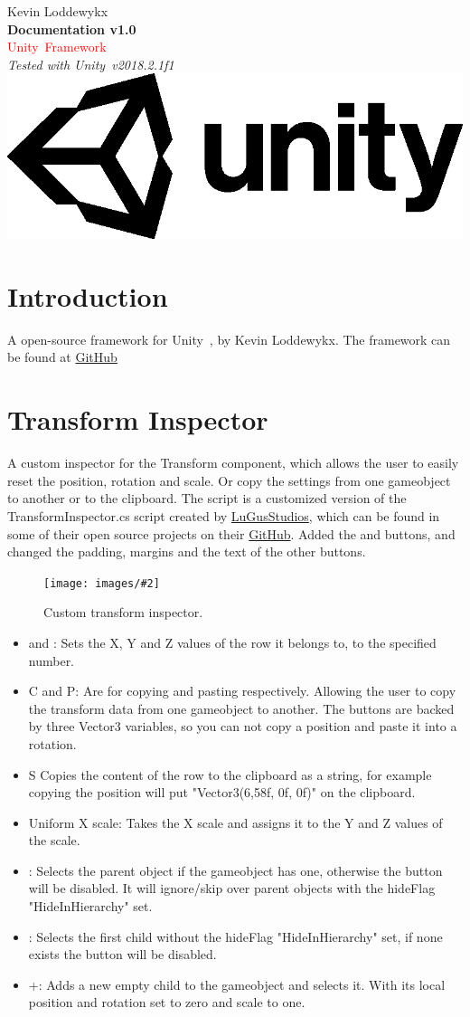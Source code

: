\documentclass{paper}
\newcommand{\frontpage}
{
	\begin{titlepage}
	
	\raggedleft
	\changebar
	\vspace{\baselineskip}

	{\small Kevin Loddewykx}\\[0.167\textheight]
	{\large \bfseries Documentation v1.0}\\[\baselineskip]
	{\textcolor{Red}{\huge Unity\textregistered\ Framework}}\\[\baselineskip]
	{\large \textit{Tested with Unity\textregistered\ v2018.2.1f1}}\\[\baselineskip]
	\vfill
	{\includegraphics[scale=0.5]{Logos/unity-master-black}}
	\endchangebar
	\end{titlepage}
}
\newlength{\imgwidth} %
\newcommand\scalegraphics[3][]
{
	\begin{figure}[H]
	\centering
	\settowidth{\imgwidth}{\texttt{[image: images/\#2]}} %
	\setlength{\imgwidth}{\minof{#1\imgwidth}{\textwidth}} %
	\texttt{[image: images/\#2]} %
	\caption{#3}
	\end{figure}
}
\newcommand*\bracket[1]{\lbrack#1\rbrack} %
\begin{document}
\frontpage

\newpage
\tableofcontents

\raggedright

\newpage
\section{Introduction}\label{sec:wa}
A open-source framework for Unity\textregistered\ , by Kevin Loddewykx. The framework can be found at \href{https://github.com/UpwindSpring01/UnityFramework}{GitHub}

\newpage
\section{Transform Inspector}
A custom inspector for the Transform component, which allows the user to easily reset the position, rotation and scale. Or copy the settings from one gameobject to another or to the clipboard. The script is a customized version of the TransformInspector.cs script created by \href{http://www.lugus-studios.be/}{LuGusStudios}, which can be found in some of their open source projects on their \href{https://github.com/LuGusStudios/PinballPlanet/find/master}{GitHub}. Added the \bracket{} and \bracket{} buttons, and changed the padding, margins and the text of the other buttons.
\scalegraphics{TransformInspector.png}{Custom transform inspector.}

\begin{itemize}
\item \bracket{0} and \bracket{1}: Sets the X, Y and Z values of the row it belongs to, to the specified number.
\item \bracket{C} and \bracket{P}: Are for copying and pasting respectively. Allowing the user to copy the transform data from one gameobject to another. The buttons are backed by three Vector3 variables, so you can not copy a position and paste it into a rotation.
\item \bracket{S} Copies the content of the row to the clipboard as a string, for example copying the position will put "Vector3(6,58f, 0f, 0f)" on the clipboard.
\end{itemize}
\begin{itemize}
\item \bracket{Uniform X scale}: Takes the X scale and assigns it to the Y and Z values of the scale.
\item \bracket{}: Selects the parent object if the gameobject has one, otherwise the button will be disabled. It will ignore/skip over parent objects with the hideFlag "HideInHierarchy" set.
\item \bracket{}: Selects the first child without the hideFlag "HideInHierarchy" set, if none exists the button will be disabled.
\item \bracket{+}: Adds a new empty child to the gameobject and selects it. With its local position and rotation set to zero and scale to one.
\end{itemize}
\end{document}
